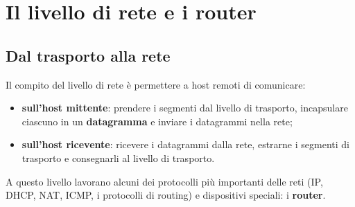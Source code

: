 \chapter{Il livello di rete e i router}

\begin{center}
\end{center}

\section{Dal trasporto alla rete}

Il compito del livello di rete è permettere a host remoti di comunicare:

\begin{itemize}
    \item \textbf{sull'host mittente}: prendere i segmenti dal livello di trasporto, incapsulare ciascuno in un
          \textbf{datagramma} e inviare i datagrammi nella rete;
    \item \textbf{sull'host ricevente}: ricevere i datagrammi dalla rete, estrarne i segmenti di trasporto e
          consegnarli al livello di trasporto.
\end{itemize}

A questo livello lavorano alcuni dei protocolli più importanti delle reti (IP, DHCP, NAT, ICMP, i protocolli di
routing) e dispositivi speciali: i \textbf{router}.

